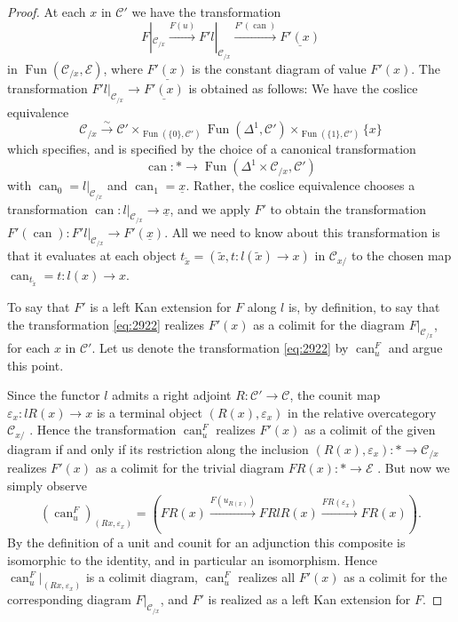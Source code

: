 \documentclass[reqno]{amsart}
\theoremstyle{definition}
\newcommand{\msc}[1]{\mathscr{#1}}
\newcommand{\opn}[1]{\operatorname{#1}}
\DeclareMathOperator{\Fun}{Fun}
\renewcommand{\1}{\mathbf{1}}
\begin{document}
\begin{proof}
At each $x$ in $\msc{C}'$ we have the transformation
\begin{equation}\label{eq:2922}
F|_{\msc{C}_{/x}}\overset{F(u)}\to F'l|_{\msc{C}_{/x}}\overset{F'(\opn{can})}\to \underline{F'(x)}
\end{equation}
in $\Fun(\msc{C}_{/x},\msc{E})$, where $\underline{F'(x)}$ is the constant diagram of value $F'(x)$.  The transformation $F'l|_{\msc{C}_{/x}}\to \underline{F'(x)}$ is obtained as follows: We have the coslice equivalence
\[
\msc{C}_{/x}\overset{\sim}\to \msc{C}'\times_{\Fun(\{0\},\msc{C}')}\Fun(\Delta^1,\msc{C}')\times_{\Fun(\{1\},\msc{C}')}\{x\}
\]
\cite[\href{https://kerodon.net/tag/02GH}{02GH}]{kerodon} which specifies, and is specified by the choice of a canonical transformation
\[
\opn{can}:\ast\to \Fun(\Delta^1\times\msc{C}_{/x},\msc{C}')
\]
with $\opn{can}_0=l|_{\msc{C}_{/x}}$ and $\opn{can}_1=\underline{x}$.  Rather, the coslice equivalence chooses a transformation $\opn{can}:l|_{\msc{C}_{/x}}\to \underline{x}$, and we apply $F'$ to obtain the transformation $F'(\opn{can}):F'l|_{\msc{C}_{/x}}\to F'(\underline{x})$.  All we need to know about this transformation is that it evaluates at each object $t_{\tilde{x}}=(\tilde{x},t:l(\tilde{x})\to x)$ in $\msc{C}_{x/}$ to the chosen map $\opn{can}_{t_{\tilde{x}}}=t:l(x)\to x$.

To say that $F'$ is a left Kan extension for $F$ along $l$ is, by definition, to say that the transformation \eqref{eq:2922} realizes $F'(x)$ as a colimit for the diagram $F|_{\msc{C}_{/x}}$, for each $x$ in $\msc{C}'$.  Let us denote the transformation \eqref{eq:2922} by $\opn{can}^F_u$ and argue this point.
\par

Since the functor $l$ admits a right adjoint $R:\msc{C}'\to \msc{C}$, the counit map $\varepsilon_x:lR(x)\to x$ is a terminal object $(R(x),\varepsilon_x)$ in the relative overcategory $\msc{C}_{x/}$ \cite[\href{https://kerodon.net/tag/02J9}{02J9}, \href{https://kerodon.net/tag/038S}{038S}]{kerodon}.  Hence the transformation $\opn{can}^F_u$ realizes $F'(x)$ as a colimit of the given diagram if and only if its restriction along the inclusion $(R(x),\varepsilon_x):\ast\to \msc{C}_{/x}$ realizes $F'(x)$ as a colimit for the trivial diagram $FR(x):\ast\to \msc{E}$ \cite[\href{https://kerodon.net/tag/02XW}{02XW}]{kerodon}. But now we simply observe
\[
(\opn{can}^F_u)_{(Rx,\varepsilon_x)}=\left(FR(x)\overset{F(u_{R(x)})}\to FRlR(x)\overset{FR(\varepsilon_x)}\to FR(x)\right).
\]
By the definition of a unit and counit for an adjunction \cite[\href{https://kerodon.net/tag/02EJ}{02EJ}]{kerodon} this composite is isomorphic to the identity, and in particular an isomorphism. Hence $\opn{can}^F_u|_{(Rx,\varepsilon_x)}$ is a colimit diagram, $\opn{can}^F_u$ realizes all $F'(x)$ as a colimit for the corresponding diagram $F|_{\msc{C}_{/x}}$, and $F'$ is realized as a left Kan extension for $F$.
\end{proof}
\end{document}
